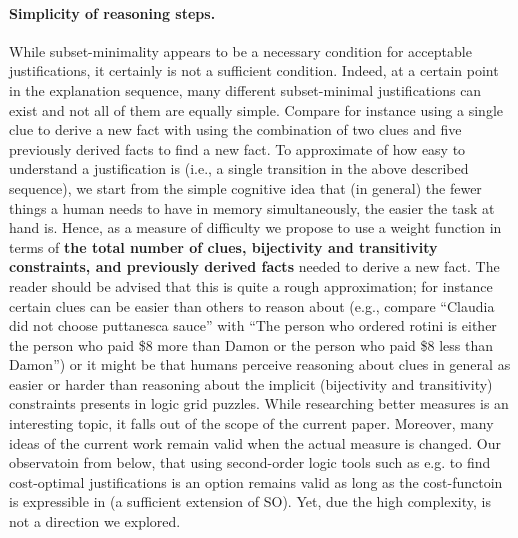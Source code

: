 \paragraph{Simplicity of reasoning steps.}
While subset-minimality appears to be a necessary condition for acceptable justifications, it certainly is not a sufficient condition. 
Indeed, at a certain point in the explanation sequence, many different subset-minimal justifications can exist and not all of them are equally simple. 
Compare for instance using a single clue to derive a new fact with using the combination of two clues and five previously derived facts to find a new fact. 
To approximate of how easy to understand a justification is (i.e., a single transition in the above described sequence), we start from the simple cognitive idea  that (in general) the fewer things a human needs to have in memory simultaneously, the easier the task at hand is. 
Hence, as a measure of difficulty we propose to use a weight function in terms of \textbf{the total number of clues, bijectivity and transitivity constraints, and previously derived facts} needed to derive a new fact. 
The reader should be advised that this is quite a rough approximation; for instance certain clues can be easier than others to reason about (e.g., compare ``Claudia did not choose puttanesca sauce'' with ``The person who ordered rotini is either the person who paid \$8 more than Damon or the person who paid \$8 less than Damon'') or it might be that humans perceive reasoning about clues in general as easier or harder than reasoning about the implicit (bijectivity and transitivity) constraints presents in logic grid puzzles. While researching better measures is an interesting topic, it falls out of the scope of the current paper. Moreover, many ideas of the current work remain valid when the actual measure is changed. 
Our observatoin from below, that using second-order logic tools such as e.g. \cite{proB,kr/BogaertsTS16} to find cost-optimal justifications is an option remains valid as long as the cost-functoin is expressible in (a sufficient extension of SO). Yet, due the high complexity, is not a direction we explored. 


